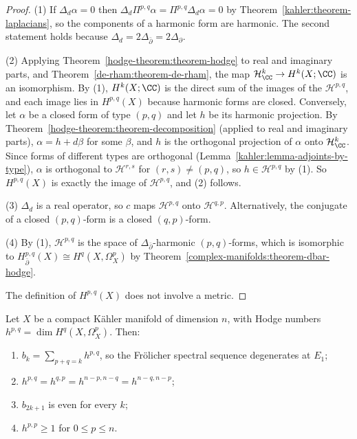 \begin{proof}
(1) If $\Delta_d\alpha = 0$ then $\Delta_d\Pi^{p,q}\alpha = \Pi^{p,q}\Delta_d\alpha = 0$ by
Theorem~\ref{kahler:theorem-laplacians}, so the components of a harmonic form are harmonic. The second statement holds
because $\Delta_d = 2\Delta_{\bar\partial} = 2\Delta_\partial$.

(2) Applying Theorem~\ref{hodge-theorem:theorem-hodge} to real and imaginary parts, and Theorem~\ref{de-rham:theorem-de-rham}, the map
$\mathcal{H}^k_{\CC} \to H^k(X; \CC)$ is an isomorphism. By (1), $H^k(X; \CC)$ is the direct sum of the images of the $\mathcal{H}^{p,q}$,
and each image lies in $H^{p,q}(X)$ because harmonic forms are closed. Conversely, let $\alpha$ be a closed form of type $(p,q)$ and let
$h$ be its harmonic projection. By Theorem~\ref{hodge-theorem:theorem-decomposition} (applied to real and imaginary parts),
$\alpha = h + d\beta$ for some $\beta$, and $h$ is the orthogonal projection of $\alpha$ onto $\mathcal{H}^k_{\CC}$. Since forms of different
types are orthogonal (Lemma~\ref{kahler:lemma-adjoints-by-type}), $\alpha$ is orthogonal to $\mathcal{H}^{r,s}$ for
$(r,s) \neq (p,q)$, so $h \in \mathcal{H}^{p,q}$ by (1). So $H^{p,q}(X)$ is exactly the image of $\mathcal{H}^{p,q}$, and (2) follows.

(3) $\Delta_d$ is a real operator, so $c$ maps $\mathcal{H}^{p,q}$ onto $\mathcal{H}^{q,p}$. Alternatively, the conjugate of a closed
$(p,q)$-form is a closed $(q,p)$-form.

(4) By (1), $\mathcal{H}^{p,q}$ is the space of $\Delta_{\bar\partial}$-harmonic $(p,q)$-forms, which is isomorphic to
$H^{p,q}_{\bar\partial}(X) \cong H^q(X, \Omega^p_X)$ by Theorem~\ref{complex-manifolds:theorem-dbar-hodge}.

The definition of $H^{p,q}(X)$ does not involve a metric.
\end{proof}

\begin{corollary}\label{kahler:corollary-hodge-numbers}
Let $X$ be a compact K\"ahler manifold of dimension $n$, with Hodge numbers $h^{p,q} = \dim H^q(X, \Omega^p_X)$. Then:
\begin{enumerate}
\item $b_k = \sum_{p+q=k}h^{p,q}$, so the Fr\"olicher spectral sequence degenerates at $E_1$;
\item $h^{p,q} = h^{q,p} = h^{n-p,n-q} = h^{n-q,n-p}$;
\item $b_{2k+1}$ is even for every $k$;
\item $h^{p,p} \geq 1$ for $0 \leq p \leq n$.
\end{enumerate}
\end{corollary}

